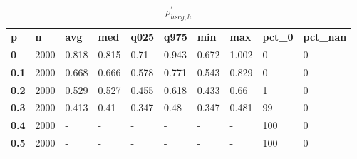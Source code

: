 \begin{table}[h]
 \centering 
\footnotesize
\caption{$\rho_{hscg,h}^\prime $}
\label{tab:alphahscgh}
\begin{tabular}[h]{| l l l l l l l l l l|
    } \hline
\textbf{ p} & \textbf{ n} & \textbf{ avg} & \textbf{ med} & \textbf{ q025} & \textbf{ q975} & \textbf{ min} & \textbf{ max} & \textbf{ pct\_0} & \textbf{ pct\_nan}
           \\
  \textbf{  0} & 2000 & 0.818 & 0.815 &  0.71 & 0.943 & 0.672 & 1.002 &   0 & 0
           \\
  \textbf{0.1} & 2000 & 0.668 & 0.666 & 0.578 & 0.771 & 0.543 & 0.829 &   0 & 0
           \\
  \textbf{0.2} & 2000 & 0.529 & 0.527 & 0.455 & 0.618 & 0.433 &  0.66 &   1 & 0
           \\
  \textbf{0.3} & 2000 & 0.413 &  0.41 & 0.347 &  0.48 & 0.347 & 0.481 &  99 & 0
           \\
  \textbf{0.4} & 2000 & - & - & - & - & - & - & 100 & 0
           \\
  \textbf{0.5} & 2000 & - & - & - & - & - & - & 100 & 0
           \\
 \hline \end{tabular}
 \end{table}

